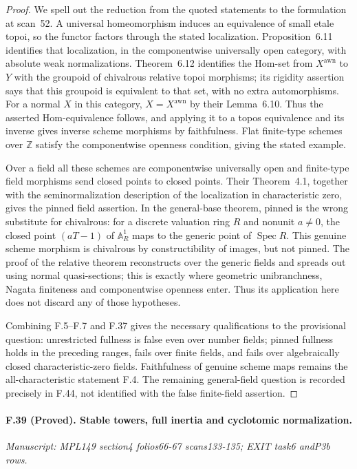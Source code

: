 \begin{proof}
We spell out the reduction from the quoted statements to the formulation
at scan~52. A universal homeomorphism induces an equivalence of small
etale topoi, so the functor factors through the stated localization.
Proposition~6.11 identifies that localization, in the componentwise
universally open category, with absolute weak normalizations. Theorem~6.12
identifies the Hom-set from $X^{\mathrm{awn}}$ to $Y$ with the groupoid
of chivalrous relative topoi morphisms; its rigidity assertion says that
this groupoid is equivalent to that set, with no extra automorphisms.
For a normal $X$ in this category, $X=X^{\mathrm{awn}}$ by their
Lemma~6.10. Thus the asserted Hom-equivalence follows, and applying it
to a topos equivalence and its inverse gives inverse scheme morphisms
by faithfulness. Flat finite-type schemes over $\mathbb Z$ satisfy the
componentwise openness condition, giving the stated example.

Over a field all these schemes are componentwise universally open and
finite-type field morphisms send closed points to closed points. Their
Theorem~4.1, together with the seminormalization description of the
localization in characteristic zero, gives the pinned field assertion.
In the general-base theorem, pinned is the wrong substitute for
chivalrous: for a discrete valuation ring $R$ and nonunit $a\ne0$, the
closed point $(aT-1)$ of $\mathbb A^1_R$ maps to the generic point of
$\operatorname{Spec}R$. This genuine scheme morphism is chivalrous by
constructibility of images, but not pinned. The proof of the relative
theorem reconstructs over the generic fields and spreads out using
normal quasi-sections; this is exactly where geometric unibranchness,
Nagata finiteness and componentwise openness enter. Thus its application
here does not discard any of those hypotheses.

Combining F.5--F.7 and F.37 gives the necessary qualifications to the
provisional question: unrestricted fullness is false even over number
fields; pinned fullness holds in the preceding ranges, fails over finite
fields, and fails over algebraically closed characteristic-zero fields.
Faithfulness of genuine scheme maps remains the all-characteristic
statement F.4. The remaining general-field question is recorded precisely
in F.44, not identified with the false finite-field assertion.
\end{proof}


\paragraph{F.39 (Proved). Stable towers, full inertia and cyclotomic normalization.}
\textit{Manuscript: MPL149 section4 folios66-67 scans133-135; EXIT task6 andP3b rows.}

